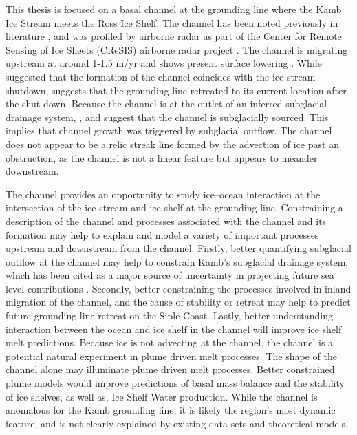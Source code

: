 This thesis is focused on a basal channel at the grounding line where the Kamb Ice Stream meets the Ross Ice Shelf. The channel has been noted previously in literature \citep{le2009subglacial,alley2016impacts,kim2016active,goeller2015subglacial,horgan2017poststagnation}, and was profiled by airborne radar as part of the Center for Remote Sensing of Ice Sheets (CReSIS) airborne radar project \citep{arnold2020cresis}. The channel is migrating upstream at around 1-1.5 m/yr and shows present surface lowering \citep{kim2016active}. While \cite{kim2016active} suggested that the formation of the channel coincides with the ice stream shutdown,   \cite{horgan2017poststagnation} suggests that the grounding line retreated to its current location after the shut down. Because the channel is at the outlet of an inferred subglacial drainage system, \cite{le2009subglacial}, \cite{alley2016impacts} and \cite{kim2016active} suggest that the channel is subglacially sourced. This implies that channel growth was triggered by subglacial outflow. The channel does not appear to be a relic streak line formed by the advection of ice past an obstruction, as the channel is not a linear feature but appears to meander downstream.



The channel provides an opportunity to study ice--ocean interaction at the intersection of the ice stream and ice shelf at the grounding line.  Constraining a description of the channel and processes associated with the channel and its formation may help to explain and model a variety of important processes upstream and downstream from the channel. Firstly, better quantifying subglacial outflow at the channel may help to constrain Kamb's subglacial drainage system, which has been cited as a major source of uncertainty in projecting future sea level contributions \citep{bougamont2015reactivation}. Secondly, better constraining the processes involved in inland migration of the channel, and the cause of stability or retreat may help to predict future grounding line retreat on the Siple Coast. Lastly, better understanding interaction between the ocean and ice shelf in the channel will improve ice shelf melt predictions.  Because ice is not advecting at the channel, the channel is a potential natural experiment in plume driven melt processes. The shape of the channel alone may illuminate plume driven melt processes.  Better constrained plume models would improve predictions of basal mass balance and the stability of ice shelves, as well as, Ice Shelf Water production.  While the channel is anomalous for the Kamb grounding line, it is likely the region's most dynamic feature, and is not clearly explained by existing data-sets and theoretical models.

